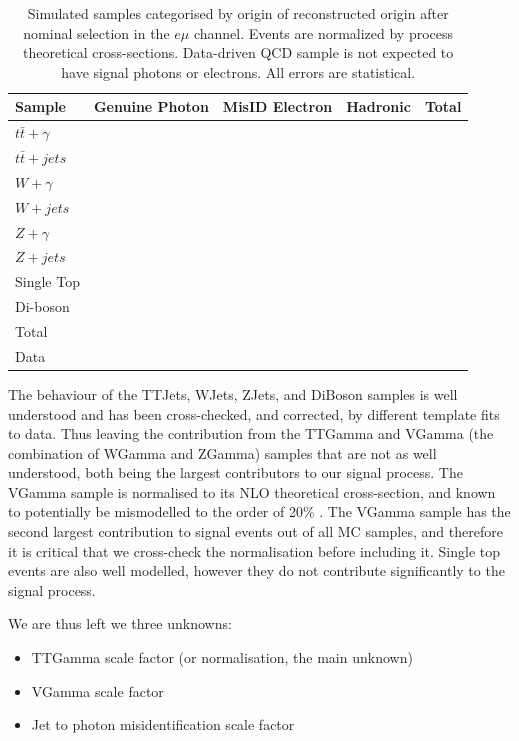 \begin{table}
\begin{center}
\begin{tabular}{l|ccc|c}
\hline
	\textbf{Sample} & \textbf{Genuine Photon} & \textbf{MisID Electron} & \textbf{Hadronic} & \textbf{Total} \\
\hline
	$t\bar{t}+\gamma$ & & & & \\
	$t\bar{t}+jets$ & & & & \\
	$W+\gamma$ &  & & & \\
	$W+jets$ & & & & \\
	$Z+\gamma$ & & & & \\
	$Z+jets$ &  &  &  & \\
	Single Top &  & & & \\
	Di-boson  & & & & \\
\hline
	Total & & & & \\
	Data & & & & \\
\hline	
\end{tabular}
\end{center}
\caption{Simulated samples categorised by origin of reconstructed origin after nominal selection in the $e\mu$ channel. Events are normalized by process theoretical cross-sections. Data-driven QCD sample is not expected to have signal photons or electrons. All errors are statistical.}
\label{tab-SigPhotonsEMu}
\end{table}	

The behaviour of the TTJets, WJets, ZJets, and DiBoson samples is well understood and has been cross-checked, and corrected, by different template fits to data. Thus leaving the contribution from the TTGamma and VGamma (the combination of WGamma and ZGamma) samples that are not as well understood, both being the largest contributors to our signal process. The VGamma sample is normalised to its NLO theoretical cross-section, and known to potentially be mismodelled to the order of 20\% \cite{PhysRevD.89.092005}. The VGamma sample has the second largest contribution to signal events out of all MC samples, and therefore it is critical that we cross-check the normalisation before including it. Single top events are also well modelled, however they do not contribute significantly to the signal process.

We are thus left we three unknowns:

\begin{itemize}
	\item TTGamma scale factor (or normalisation, the main unknown) 
	\item VGamma scale factor
	\item Jet to photon misidentification scale factor
\end{itemize}

